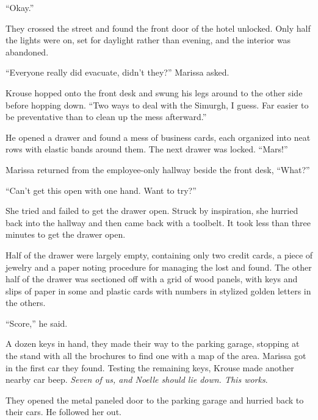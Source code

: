 ``Okay.''



They crossed the street and found the front door of the hotel unlocked.  Only half the lights were on, set for daylight rather than evening, and the interior was abandoned.



``Everyone really did evacuate, didn't they?''  Marissa asked.



Krouse hopped onto the front desk and swung his legs around to the other side before hopping down. ``Two ways to deal with the Simurgh, I guess.  Far easier to be preventative than to clean up the mess afterward.''



He opened a drawer and found a mess of business cards, each organized into neat rows with elastic bands around them.  The next drawer was locked.  ``Mars!''



Marissa returned from the employee-only hallway beside the front desk, ``What?''



``Can't get this open with one hand.  Want to try?''



She tried and failed to get the drawer open.  Struck by inspiration, she hurried back into the hallway and then came back with a toolbelt.  It took less than three minutes to get the drawer open.



Half of the drawer were largely empty, containing only two credit cards, a piece of jewelry and a paper noting procedure for managing the lost and found.  The other half of the drawer was sectioned off with a grid of wood panels, with keys and slips of paper in some and plastic cards with numbers in stylized golden letters in the others.



``Score,'' he said.



A dozen keys in hand, they made their way to the parking garage, stopping at the stand with all the brochures to find one with a map of the area.  Marissa got in the first car they found.  Testing the remaining keys, Krouse made another nearby car beep.  \emph{Seven of us, and Noelle should lie down.  This works}.



They opened the metal paneled door to the parking garage and hurried back to their cars.  He followed her out.



